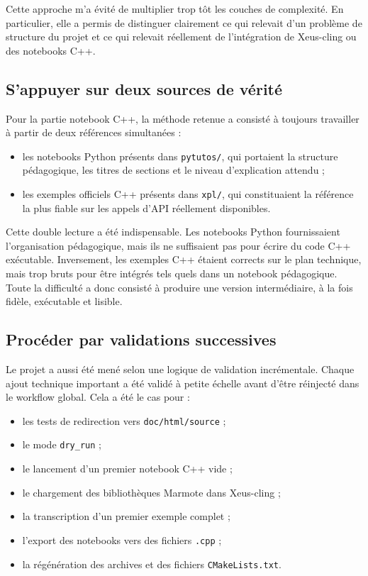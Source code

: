\documentclass[a4paper,12pt,twoside]{article}
\begin{document}
Cette approche m'a évité de multiplier trop tôt les couches de complexité. En particulier, elle a permis de distinguer clairement ce qui relevait d'un problème de structure du projet et ce qui relevait réellement de l'intégration de Xeus-cling ou des notebooks C++.

\subsection{S'appuyer sur deux sources de vérité}

Pour la partie notebook C++, la méthode retenue a consisté à toujours travailler à partir de deux références simultanées :
\begin{itemize}
    \item les notebooks Python présents dans \texttt{pytutos/}, qui portaient la structure pédagogique, les titres de sections et le niveau d'explication attendu ;
    \item les exemples officiels C++ présents dans \texttt{xpl/}, qui constituaient la référence la plus fiable sur les appels d'API réellement disponibles.
\end{itemize}

Cette double lecture a été indispensable. Les notebooks Python fournissaient l'organisation pédagogique, mais ils ne suffisaient pas pour écrire du code C++ exécutable. Inversement, les exemples C++ étaient corrects sur le plan technique, mais trop bruts pour être intégrés tels quels dans un notebook pédagogique. Toute la difficulté a donc consisté à produire une version intermédiaire, à la fois fidèle, exécutable et lisible.

\subsection{Procéder par validations successives}

Le projet a aussi été mené selon une logique de validation incrémentale. Chaque ajout technique important a été validé à petite échelle avant d'être réinjecté dans le workflow global. Cela a été le cas pour :
\begin{itemize}
    \item les tests de redirection vers \texttt{doc/html/source} ;
    \item le mode \texttt{dry\_run} ;
    \item le lancement d'un premier notebook C++ vide ;
    \item le chargement des bibliothèques Marmote dans Xeus-cling ;
    \item la transcription d'un premier exemple complet ;
    \item l'export des notebooks vers des fichiers \texttt{.cpp} ;
    \item la régénération des archives et des fichiers \texttt{CMakeLists.txt}.
\end{itemize}
\end{document}
